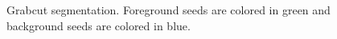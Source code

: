 \begin{figure}
{}\hspace{1em}
\caption{Grabcut segmentation. Foreground seeds are colored in green and background seeds are colored in blue.}
\end{figure}

